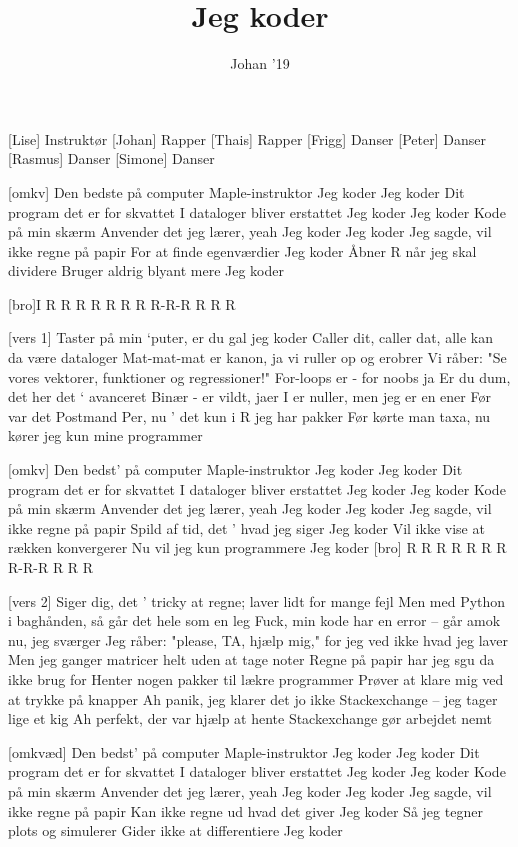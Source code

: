 \documentclass[a4paper,11pt]{article}
\title{Jeg koder}
\author{Johan '19}
\begin{document}
\maketitle

\begin{roles}
[Lise] Instruktør
[Johan] Rapper
[Thais] Rapper
[Frigg] Danser
[Peter] Danser
[Rasmus] Danser
[Simone] Danser
\end{roles}



\begin{song}
[omkv] Den bedste på computer
Maple-instruktor
Jeg koder
Jeg koder
Dit program det er for skvattet
I dataloger bliver erstattet
Jeg koder
Jeg koder
Kode på min skærm
Anvender det jeg lærer, yeah
Jeg koder
Jeg koder
Jeg sagde, vil ikke regne på papir
For at finde egenværdier
Jeg koder
Åbner R når jeg skal dividere
Bruger aldrig blyant mere
Jeg koder

[bro]I  R R R R R R R R-R-R R R R

[vers 1] Taster på min ‘puter, er du gal jeg koder
Caller dit, caller dat, alle kan da være dataloger
Mat-mat-mat er kanon, ja vi ruller op og erobrer
Vi råber: "Se vores vektorer, funktioner og regressioner!"
For-loops er - for noobs ja
Er du dum, det her det ‘ avanceret
Binær - er vildt, jaer
I er nuller, men jeg er en ener
Før var det Postmand Per, nu ' det kun i R jeg har pakker
Før kørte man taxa, nu kører jeg kun mine programmer

[omkv] Den bedst' på computer
Maple-instruktor
Jeg koder
Jeg koder
Dit program det er for skvattet
I dataloger bliver erstattet
Jeg koder
Jeg koder
Kode på min skærm
Anvender det jeg lærer, yeah
Jeg koder
Jeg koder
Jeg sagde, vil ikke regne på papir
Spild af tid, det ' hvad jeg siger
Jeg koder
Vil ikke vise at rækken konvergerer
Nu vil jeg kun programmere
Jeg koder
[bro] R R R R R R R R-R-R R R R

[vers 2] Siger dig, det ' tricky at regne; laver lidt for mange fejl
Men med Python i baghånden, så går det hele som en leg
Fuck, min kode har en error – går amok nu, jeg sværger
Jeg råber: "please, TA, hjælp mig," for jeg ved ikke hvad jeg laver
Men jeg ganger matricer helt uden at tage noter
Regne på papir har jeg sgu da ikke brug for
Henter nogen pakker til lækre programmer
Prøver at klare mig ved at trykke på knapper
Ah panik, jeg klarer det jo ikke
Stackexchange – jeg tager lige et kig
Ah perfekt, der var hjælp at hente
Stackexchange gør arbejdet nemt

[omkvæd] Den bedst' på computer
Maple-instruktor
Jeg koder
Jeg koder
Dit program det er for skvattet
I dataloger bliver erstattet
Jeg koder
Jeg koder
Kode på min skærm
Anvender det jeg lærer, yeah
Jeg koder
Jeg koder
Jeg sagde, vil ikke regne på papir
Kan ikke regne ud hvad det giver
Jeg koder
Så jeg tegner plots og simulerer
Gider ikke at differentiere
Jeg koder
\end{song}
\end{document}

